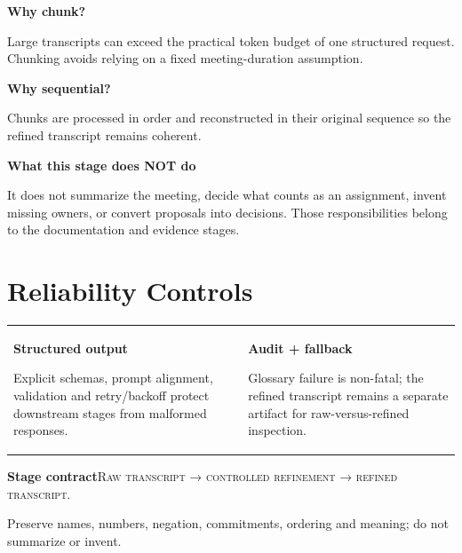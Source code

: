 \documentclass[9pt,a4paper]{extarticle}
\begin{document}
\vspace{4pt}
\begin{minipage}[t]{0.48\textwidth}
\begin{darkcard}\textbf{Why chunk?}\end{darkcard}
\begin{card}\small Large transcripts can exceed the practical token budget of one structured request. Chunking avoids relying on a fixed meeting-duration assumption.
\end{card}
\end{minipage}\hfill
\begin{minipage}[t]{0.48\textwidth}
\begin{darkcard}\textbf{Why sequential?}\end{darkcard}
\begin{card}\small Chunks are processed in order and reconstructed in their original sequence so the refined transcript remains coherent.
\end{card}
\end{minipage}

\vspace{4pt}
\begin{card}
\textbf{What this stage does NOT do}\par
It does not summarize the meeting, decide what counts as an assignment, invent missing owners, or convert proposals into decisions. Those responsibilities belong to the documentation and evidence stages.
\end{card}

\vspace{4pt}
\section*{Reliability Controls}
\begin{tabularx}{\textwidth}{@{}XX@{}}
\begin{card}\textbf{Structured output}\par Explicit schemas, prompt alignment, validation and retry/backoff protect downstream stages from malformed responses.\end{card}&
\begin{card}\textbf{Audit + fallback}\par Glossary failure is non-fatal; the refined transcript remains a separate artifact for raw-versus-refined inspection.\end{card}
\end{tabularx}

\vspace{4pt}
\begin{darkcard}
\textbf{Stage contract}\quad \textsc{Raw transcript → controlled refinement → refined transcript.}\par
\small Preserve names, numbers, negation, commitments, ordering and meaning; do not summarize or invent.
\end{darkcard}
\end{document}
